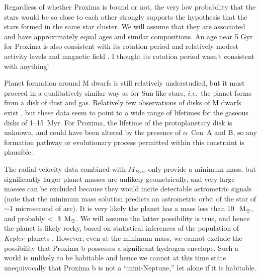 \documentclass[preprint,12pt]{aastex}
\newcommand{\xxx}[1]{{\color{red} #1}} %
\newcommand{\xxx}[1]{{\color{red} #1}} %
\def\mearth{{\rm\,M_\oplus}}
\def\eg{{\it e.g.\ }}
\def\ie{{\it i.e.\ }}
\def\acen{{$\alpha$~Cen}}
\def\kepler{{\it Kepler}}
\begin{document}
Regardless of whether Proxima is bound or not, the very low
probability that the stars would be so close to each other strongly
supports the hypothesis that the stars formed in the same star
cluster. We will assume that they are associated and have
approximately equal ages and similar compositions. An age near 5 Gyr
for Proxima is also consistent with its rotation period and relatively
modest activity levels and magnetic field \citep{ReinersBasri08}. 
\xxx{I thought its rotation period wasn't consistent with anything!}

Planet formation around M dwarfs is still relatively understudied, but
it must proceed in a qualitatively similar way as for Sun-like stars,
\ie the planet forms from a disk of dust and gas. Relatively few
observations of disks of M dwarfs exist
\citep[\eg][]{Hernandez07,WilliamsCieza11,Luhman12,Downes15}, but
these data seem to point to a wide range of lifetimes for the gaseous
disks of 1--15~Myr. For Proxima, the lifetime of the protoplanetary
disk is unknown, and could have been altered by the presence of
\acen~A and B, so any formation pathway or \xxx{evolutionary} process
permitted within this constraint is plausible.

The radial velocity data combined with $M_{Prox}$ only provide a
minimum mass, but significantly larger planet masses are unlikely
geometrically, and very large masses can be excluded because they
would incite detectable astrometric signals (note that the minimum
mass solution predicts an astrometric orbit of the star of $\sim$1
microsecond of arc). It is very likely the planet has a mass less than
10~$\mearth$, and probably $<~3~\mearth$. We will assume the latter
possibility is true, and hence the planet is likely rocky, based on
statistical inferences of the population of \kepler~planets
\citep{WeissMarcy14,Rogers15}. However, even at the minimum mass, we
cannot exclude the possibility that Proxima b possesses a significant
hydrogen envelope. Such a world is unlikely to be habitable \citep[but
  see][]{PierrehumbertGaidos11} and hence we cannot at this time state
unequivocally that Proxima b is not a ``mini-Neptune,'' let alone if
it is habitable.
\end{document}
